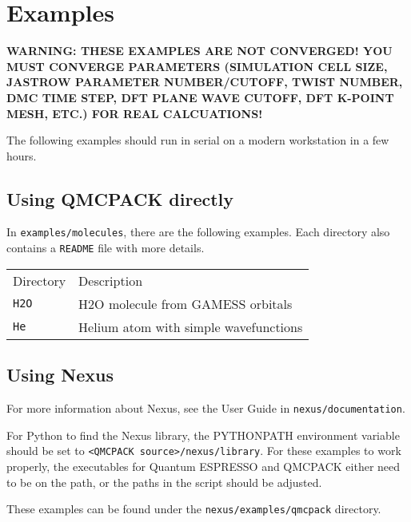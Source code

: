 \chapter{Examples}
\label{chap:examples}

\textbf{WARNING: THESE EXAMPLES ARE NOT CONVERGED! YOU MUST CONVERGE PARAMETERS (SIMULATION CELL SIZE, JASTROW PARAMETER NUMBER/CUTOFF, TWIST NUMBER, DMC TIME STEP, DFT PLANE WAVE CUTOFF, DFT K-POINT MESH, ETC.) FOR REAL CALCUATIONS!}

The following examples should run in serial on a modern workstation in a few hours.

\section{Using QMCPACK directly}

In \texttt{examples/molecules}, there are the following examples.
Each directory also contains a \texttt{README} file with more details.

\begin{tabular}{l l}
Directory  & Description \\
\texttt{H2O} &  H2O molecule from GAMESS orbitals \\
\texttt{He} &  Helium atom with simple wavefunctions\\
\end{tabular}




\section{Using Nexus}

For more information about Nexus, see the User Guide in \texttt{nexus/documentation}.

For Python to find the Nexus library, the PYTHONPATH environment variable should be set to \texttt{<QMCPACK source>/nexus/library}.
For these examples to work properly, the executables for Quantum ESPRESSO and QMCPACK either
need to be on the path, or the paths in the script should be adjusted.

These examples can be found under the \texttt{nexus/examples/qmcpack} directory.

